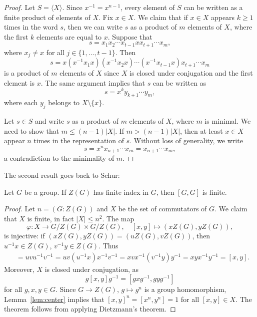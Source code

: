 \begin{proof}
	Let $S=\langle X\rangle$. Since $x^{-1}=x^{n-1}$, every element of $S$ can be 
	written as a finite product of elements of $X$. 
	Fix $x\in X$. We claim that if $x\in X$ appears $k\geq 1$ times 
	in the word $s$, then we can write $s$ as a product of $m$
	elements of $X$, where the first $k$ elements are equal to $x$. Suppose that 
	\[
	s=x_1x_2\cdots x_{t-1}xx_{t+1}\cdots x_m,
	\]
	where $x_j\ne x$ for all $j\in\{1,\dots,t-1\}$. Then 
	\[
		s=x(x^{-1}x_1x)(x^{-1}x_2x)\cdots (x^{-1}x_{t-1}x)x_{t+1}\cdots x_m
	\]
	is a product of $m$ elements of $X$ since $X$ is closed under conjugation and 
	the first element is $x$. The same argument implies that $s$
	can be written as 
	\[
		s=x^ky_{k+1}\cdots y_m,
	\]
	where each $y_j$ belongs to $X\setminus\{x\}$.

	Let $s\in S$ and write $s$ as a product of $m$ elements of 
	$X$, where $m$ is minimal. We need to show that 
	$m\leq (n-1)|X|$. 
	If $m>(n-1)|X|$, 
	then at least $x\in X$ appear $n$ times in the representation of 
	$s$. Without loss of generality, we write 
	\[
		s=x^nx_{n+1}\cdots x_m=x_{n+1}\cdots x_m,
	\]
	a contradiction to the minimality of $m$. 
\end{proof}

The second result goes back to Schur:

\begin{theorem}[Schur]
\label{thm:Schur}
	Let $G$ be a group. 
	If $Z(G)$ has finite index in $G$, then $[G,G]$ is finite.
\end{theorem}

\begin{proof}
	Let $n=(G:Z(G))$ and  
	$X$ be the set of commutators of $G$. We claim that $X$ is finite, in fact
	$|X|\leq n^2$.
	The map 
	\[
		\varphi\colon X\to G/Z(G)\times G/Z(G),\quad [x,y]\mapsto (xZ(G),yZ(G)),
	\]
	is injective: if $(xZ(G),yZ(G))=(uZ(G),vZ(G))$, then $u^{-1}x\in Z(G)$, 
	$v^{-1}y\in Z(G)$. Thus 
	\begin{align*}
		[u,v]&=uvu^{-1}v^{-1}=uv(u^{-1}x)x^{-1}v^{-1}=xvx^{-1}(v^{-1}y)y^{-1}=xyx^{-1}y^{-1}=[x,y].
	\end{align*}
	Moreover, $X$ is closed under conjugation, as 
	\[
		g[x,y]g^{-1}=[gxg^{-1},gyg^{-1}]
	\]
	for all $g,x,y\in G$. Since $G\to Z(G)$, $g\mapsto g^n$ is a group
	homomorphism, Lemma~\ref{lem:center} implies that $[x,y]^n=[x^n,y^n]=1$ for
	all $[x,y]\in X$.  The theorem follows from applying Dietzmann's theorem. 
\end{proof}


